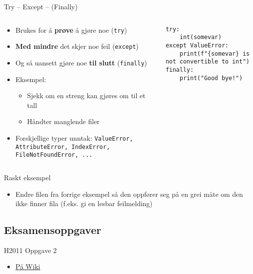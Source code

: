 \documentclass[screen, aspectratio=169]{beamer}
\begin{document}
\begin{frame}[fragile]{Try -- Except -- (Finally)}
	\begin{columns}
		\begin{column}{.5\textwidth}
			\begin{itemize}
				\item Brukes for å \textbf{prøve} å gjøre noe (\lstinline|try|)
				\item \textbf{Med mindre} det skjer noe feil (\lstinline|except|)
				\item Og så uansett gjøre noe \textbf{til slutt} (\lstinline|finally|)
				\item Eksempel:
				\begin{itemize}
					\item Sjekk om en streng kan gjøres om til et tall
					\item Håndter manglende filer
				\end{itemize}
				\item Forskjellige typer unntak: \lstinline|ValueError, AttributeError, IndexError, FileNotFoundError, ...|
			\end{itemize}
		\end{column}
		\begin{column}{.5\textwidth}
			\begin{lstlisting}
try:
	int(somevar)
except ValueError:
	print(f"{somevar} is not convertible to int")
finally:
	print("Good bye!")
			\end{lstlisting}
		\end{column}
	\end{columns}
\end{frame}

\begin{frame}{Raskt eksempel}
	\begin{itemize}
		\item Endre filen fra forrige eksempel så den oppfører seg på en grei måte om den ikke finner fila (f.eks. gi en lesbar feilmelding)
	\end{itemize}
\end{frame}

\subsection{Eksamensoppgaver}

\begin{frame}{H2011 Oppgave 2}
	\begin{itemize}
		\item \href{https://www.ntnu.no/wiki/display/tdt4110/Python+eksamensoppgaver?preview=/78972128/79298929/Python2011.pdf}{På Wiki}
	\end{itemize}
\end{frame}
\end{document}
